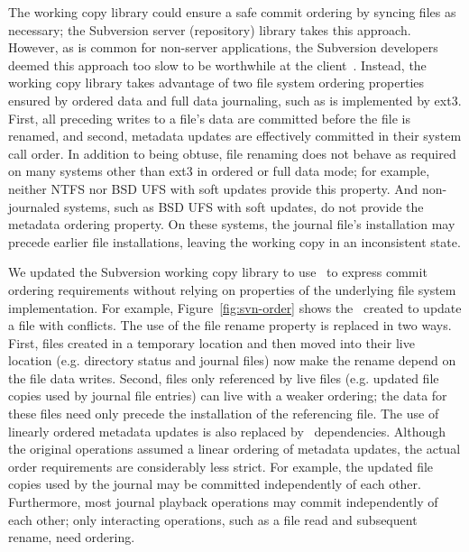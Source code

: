 The working copy library could ensure a safe commit ordering by
syncing files as necessary; the Subversion server (repository) library
takes this approach.
%
However, as is common for non-server applications, the Subversion
developers deemed this approach too slow to be worthwhile at the
client~\cite{svntradeoff}.
%
Instead, the working copy library takes advantage of two file system
ordering properties ensured by ordered data and full data journaling, such
as is implemented by ext3.
%
First, all preceding writes to a file's data are committed before the file
is renamed,
%
and second, metadata updates are effectively committed in their system call
order.
%
%
In addition to being obtuse, file renaming does not behave
as required on many systems other than ext3 in ordered or full data
mode; for example, neither NTFS nor BSD UFS with soft updates provide
this property.
%
And non-journaled systems, such as BSD UFS with soft updates, do not
provide the metadata ordering property. On these systems, the journal
file's installation may precede earlier file installations, leaving the
working copy in an inconsistent state.

We updated the Subversion working copy library to use \patchgroups\ to
express commit ordering requirements
without relying on properties of the
underlying file system implementation.
%
For example, Figure~\ref{fig:svn-order} shows the \patchgroups\ created to update a
file with conflicts.
%
The use of the file rename property is replaced in two ways.
%
First, files created in a temporary location and then moved into their
live location (e.g. directory status and journal files) now
make the rename depend on the file data writes.
%
Second, files only referenced by live files (e.g. updated file
copies used by journal file entries) can live with a weaker ordering;
the data for these files need only precede the installation of the
referencing file.
%
The use of linearly ordered metadata updates is also replaced by
\patchgroup\ dependencies.
%
Although the original operations assumed a linear ordering of metadata
updates, the actual order requirements are considerably less strict.
%
For example, the updated file copies used by the journal may be
committed independently of each other.
%
Furthermore, most journal playback operations may commit
independently of each other; only interacting operations, such as a
file read and subsequent rename, need ordering.

